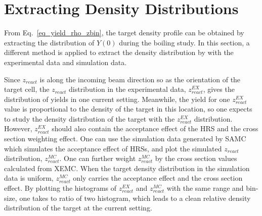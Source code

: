 \section{Extracting Density Distributions}
  From Eq.~\eqref{eq_yield_rho_zbin}, the target density profile can be obtained by extracting the distribution of $Y(0)$ during the boiling study. In this section, a different method is applied to extract the density distribution by with the experimental data and simulation data. 
  
  Since $z_{react}$ is along the incoming beam direction so as the orientation of the target cell, the $z_{react}$ distribution in the experimental data, $z_{react}^{EX}$, gives the distribution of yields in one current setting. Meanwhile, the yield for one $z_{react}^{EX}$ value is proportional to the density of the target in this location, so one expects to study the density distribution of the target with the $z_{react}^{EX}$ distribution. However, $z_{react}^{EX}$ should also contain the acceptance effect of the HRS and the cross section weighting effect. One can use the simulation data generated by SAMC which simulates the acceptance effect of HRSs, and plot the simulated $z_{react}$ distribution, $z_{react}^{MC}$. One can further weight $z_{react}^{MC}$ by the cross section values calculated from XEMC. When the target density distribution in the simulation data is uniform, $z_{react}^{MC}$ only carries the acceptance effect and the cross section effect. By plotting the histograms of $z_{react}^{EX}$ and $z_{react}^{MC}$ with the same range and bin-size, one takes to ratio of two histogram, which leads to a clean relative density distribution of the target at the current setting.
  

